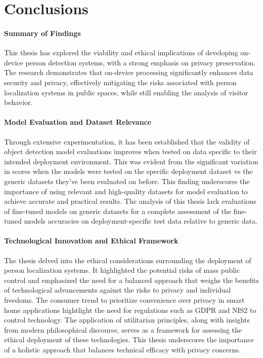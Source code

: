 \section{Conclusions}
\label{sec:conclusions}

\paragraph{Summary of Findings}
This thesis has explored the viability and ethical implications of developing on-device person detection systems, with a strong emphasis on privacy preservation. The research demonstrates that on-device processing significantly enhances data security and privacy, effectively mitigating the risks associated with person localization systems in public spaces, while still enabling the analysis of visitor behavior.

\paragraph{Model Evaluation and Dataset Relevance}
Through extensive experimentation, it has been established that the validity of object detection model evaluations improves when tested on data specific to their intended deployment environment. This was evident from the significant variation in scores when the models were tested on the specific deployment dataset vs the generic datasets they've been evaluated on before. This finding underscores the importance of using relevant and high-quality datasets for model evaluation to achieve accurate and practical results. The analysis of this thesis lack evaluations of fine-tuned models on generic datasets for a complete assessment of the fine-tuned models accuracies on deployment-specific test data relative to generic data.

\paragraph{Technological Innovation and Ethical Framework}
The thesis delved into the ethical considerations surrounding the deployment of person localization systems. It highlighted the potential risks of mass public control and emphasized the need for a balanced approach that weighs the benefits of technological advancements against the risks to privacy and individual freedoms. The consumer trend to prioritize convenience over privacy in smart home applications hightlight the need for regulations such as GDPR and NIS2 to control technology. The application of utilitarian principles, along with insights from modern philosophical discourse, serves as a framework for assessing the ethical deployment of these technologies. This thesis underscores the importance of a holistic approach that balances technical efficacy with privacy concerns.

